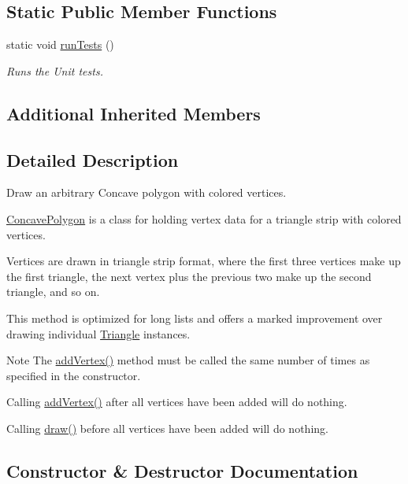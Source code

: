 \subsection*{Static Public Member Functions}
\begin{DoxyCompactItemize}
\item 
static void \hyperlink{classtsgl_1_1_concave_polygon_ace68fa148735bf43d9648cb58a04ac46}{run\+Tests} ()
\begin{DoxyCompactList}\small\item\em Runs the Unit tests. \end{DoxyCompactList}\end{DoxyCompactItemize}
\subsection*{Additional Inherited Members}


\subsection{Detailed Description}
Draw an arbitrary Concave polygon with colored vertices. 

\hyperlink{classtsgl_1_1_concave_polygon}{Concave\+Polygon} is a class for holding vertex data for a triangle strip with colored vertices.

Vertices are drawn in triangle strip format, where the first three vertices make up the first triangle, the next vertex plus the previous two make up the second triangle, and so on.

This method is optimized for long lists and offers a marked improvement over drawing individual \hyperlink{classtsgl_1_1_triangle}{Triangle} instances. \begin{DoxyNote}{Note}
The \hyperlink{classtsgl_1_1_concave_polygon_ae2675ff0bf54cc7092a9ab3418dcab30}{add\+Vertex()} method must be called the same number of times as specified in the constructor. 

Calling \hyperlink{classtsgl_1_1_concave_polygon_ae2675ff0bf54cc7092a9ab3418dcab30}{add\+Vertex()} after all vertices have been added will do nothing. 

Calling \hyperlink{classtsgl_1_1_concave_polygon_a06d759932483ae2b54bb807db20cbc4a}{draw()} before all vertices have been added will do nothing. 
\end{DoxyNote}


\subsection{Constructor \& Destructor Documentation}
\hypertarget{classtsgl_1_1_concave_polygon_a1ffb0ac20bbfa7d35683209a3c79a979}{}
